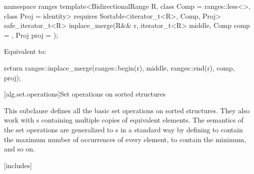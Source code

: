 \begin{itemdecl}
namespace ranges {
  template<BidirectionalRange R, class Comp = ranges::less<>, class Proj = identity>
    requires Sortable<iterator_t<R>, Comp, Proj>
    safe_iterator_t<R>
      inplace_merge(R&& r, iterator_t<R> middle, Comp comp = {}, Proj proj = {});
}
\end{itemdecl}

\begin{itemdescr}
\pnum
\effects Equivalent to:
\begin{codeblock}
return ranges::inplace_merge(ranges::begin(r), middle, ranges::end(r), comp, proj);
\end{codeblock}
\end{itemdescr}

[alg.set.operations]{Set operations on sorted structures}

\pnum
This subclause defines all the basic set operations on sorted structures.
They also work with
s
containing multiple copies of equivalent elements.
The semantics of the set operations are generalized to
s
in a standard way by defining
to contain the maximum number of occurrences of every element,
to contain the minimum, and so on.

[includes]{}

